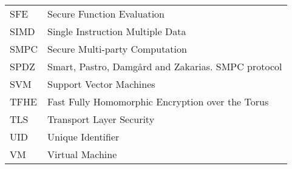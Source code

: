 \begin{center}
\begin{longtable}{ l @{\qquad} l }
	SFE       & Secure Function Evaluation \\
	SIMD      & Single Instruction Multiple Data \\
	SMPC 			& Secure Multi-party Computation \\
	SPDZ      & Smart, Pastro, Damg{\aa}rd and Zakarias. SMPC protocol \\
	SVM 			& Support Vector Machines \\
	TFHE      & Fast Fully Homomorphic Encryption over the Torus \\
	TLS 			& Transport Layer Security \\
	UID 			& Unique Identifier \\
	VM				& Virtual Machine \\

	\bottomrule
	\end{longtable}
\end{center}

